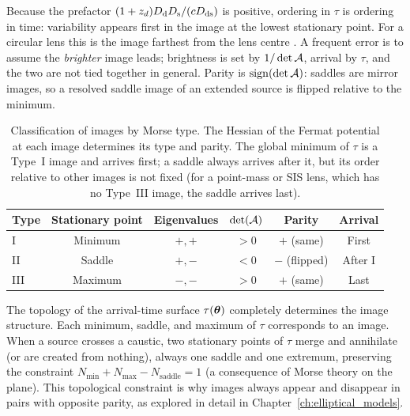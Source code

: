 \begin{annotation}
Because the prefactor $(1+z_d)D_{\mathrm{d}}D_{\mathrm{s}}/(cD_{\mathrm{ds}})$ is positive, ordering
in $\tau$ is ordering in time: variability appears first in the image at the
lowest stationary point.  For a circular lens this is the image farthest from
the lens centre \citep[Sect.~3.3.2]{narayan_lectures_1997}.  A frequent
error is to assume the \emph{brighter} image leads; brightness is set by
$1/\det\mathcal{A}$, arrival by $\tau$, and the two are not tied together in general.
Parity is $\mathrm{sign}(\det\mathcal{A})$: saddles are mirror images, so a
resolved saddle image of an extended source is flipped relative to the
minimum.
\end{annotation}

\begin{table}[ht]
\centering
\caption{Classification of images by Morse type.  The Hessian of the
Fermat potential at each image determines its type and parity.  The
global minimum of $\tau$ is a Type~I image and arrives first; a saddle
always arrives after it, but its order relative to other images is not
fixed (for a point-mass or SIS lens, which has no Type~III image, the
saddle arrives last).}
\label{tab:morse_types}
\begin{tabular}{lccccc}
\toprule
\textbf{Type} & \textbf{Stationary point} & \textbf{Eigenvalues}
& $\det(\mathcal{A})$ & \textbf{Parity} & \textbf{Arrival} \\
\midrule
I   & Minimum & $+, +$ & $> 0$ & $+$ (same) & First \\
II  & Saddle  & $+, -$ & $< 0$ & $-$ (flipped) & After I \\
III & Maximum & $-, -$ & $> 0$ & $+$ (same) & Last \\
\bottomrule
\end{tabular}
\end{table}

\begin{remark}
The topology of the arrival-time surface $\tau(\boldsymbol{\theta})$ completely
determines the image structure.  Each minimum, saddle, and maximum of
$\tau$ corresponds to an image.  When a source crosses a caustic, two
stationary points of $\tau$ merge and annihilate (or are created from
nothing), always one saddle and one extremum, preserving the
constraint $N_{\min} + N_{\max} - N_{\mathrm{saddle}} = 1$ (a
consequence of Morse theory on the plane).  This topological constraint
is why images always appear and disappear in pairs with opposite parity,
as explored in detail in Chapter~\ref{ch:elliptical_models}.
\end{remark}

